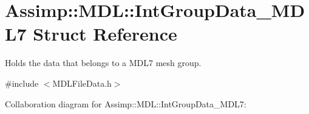 \hypertarget{struct_assimp_1_1_m_d_l_1_1_int_group_data___m_d_l7}{\section{Assimp\+:\+:M\+D\+L\+:\+:Int\+Group\+Data\+\_\+\+M\+D\+L7 Struct Reference}
\label{struct_assimp_1_1_m_d_l_1_1_int_group_data___m_d_l7}
}


Holds the data that belongs to a M\+D\+L7 mesh group.  




{\ttfamily \#include $<$M\+D\+L\+File\+Data.\+h$>$}



Collaboration diagram for Assimp\+:\+:M\+D\+L\+:\+:Int\+Group\+Data\+\_\+\+M\+D\+L7\+:
